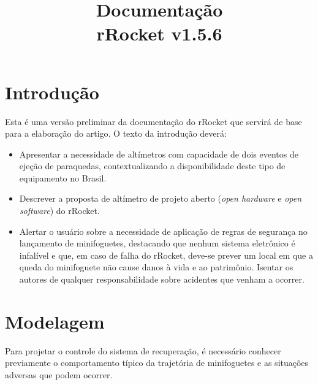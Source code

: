 \documentclass[12pt,a4paper]{article}
\title{Documentação\\ rRocket v1.5.6}
\begin{document}
	\maketitle

\section{Introdução}

Esta é uma versão preliminar da documentação do rRocket que servirá de base para a elaboração do artigo. O texto da introdução deverá:
\begin{itemize}
	\item Apresentar a necessidade de altímetros com capacidade de dois eventos de ejeção de paraquedas, contextualizando a disponibilidade deste tipo de equipamento no Brasil.
	\item Descrever a proposta de altímetro de projeto aberto (\textit{open hardware} e \textit{open software}) do rRocket. 
	\item Alertar o usuário sobre a necessidade de aplicação de regras de segurança no lançamento de minifoguetes, destacando que nenhum sistema eletrônico é infalível e que, em caso de falha do rRocket, deve-se prever um local em que a queda do minifoguete não cause danos à vida e ao patrimônio. Isentar os autores de qualquer responsabilidade sobre acidentes que venham a ocorrer.
\end{itemize}


\section{Modelagem}

Para projetar o controle do sistema de recuperação, é necessário conhecer previamente o comportamento típico da trajetória de minifoguetes e as situações adversas que podem ocorrer.
\end{document}
